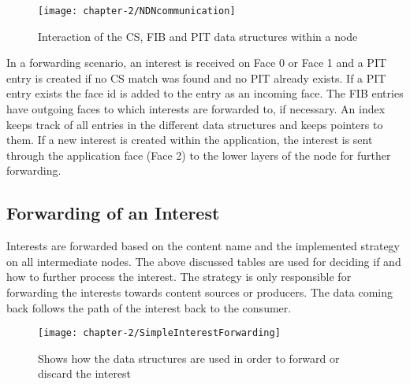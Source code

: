 \vspace{5mm} %

\begin{figure}[H]
  \centering
  \texttt{[image: chapter-2/NDNcommunication]}
  \caption{Interaction of the CS, FIB and PIT data structures within a node \cite{ndn17}}
  \label{fig:NDNcommunication}
\end{figure}

In a forwarding scenario, an interest is received on Face 0 or Face 1 and a PIT entry is created if no CS match was found and no PIT already exists. If a PIT entry exists the face id is added to the entry as an incoming face. The FIB entries have outgoing faces to which interests are forwarded to, if necessary. An index keeps track of all entries in the different data structures and keeps pointers to them. If a new interest is created within the application, the interest is sent through the application face (Face 2) to the lower layers of the node for further forwarding. 

\subsection{Forwarding of an Interest}

Interests are forwarded based on the content name and the implemented strategy on all intermediate nodes. The above discussed tables are used for deciding if and how to further process the interest. The strategy is only responsible for forwarding the interests towards content sources or producers. The data coming back follows the path of the interest back to the consumer.

\vspace{5mm} %

\begin{figure}[H]
  \centering
  \texttt{[image: chapter-2/SimpleInterestForwarding]}
  \caption{Shows how the data structures are used in order to forward or discard the interest \cite{amadeo14}}
  \label{fig:SimpleInterestForwarding}
\end{figure}

\vspace{5mm} %

